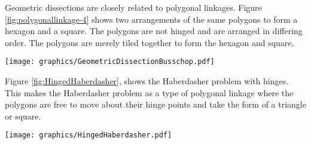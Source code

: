 Geometric dissections are closely related to polygonal linkages.  
Figure \ref{fig:polygonallinkage-4} shows two arrangements of the same polygons to form a hexagon and a square. 
The polygons are not hinged and are arranged in differing order.
The polygons are merely tiled together to form the hexagon and square. 

\begin{minipage}{\linewidth}\begin{center}
\texttt{[image: graphics/GeometricDissectionBusschop.pdf]}
\end{center}
\label{fig:polygonallinkage-4}
\end{minipage}

Figure \ref{fig:HingedHaberdasher}, shows the Haberdasher problem with hinges.  
This makes the Haberdasher problem as a type of polygonal linkage where the polygons are free to move about their hinge points and take the form of a triangle or square.  

\begin{minipage}{\linewidth}
\begin{center}
\texttt{[image: graphics/HingedHaberdasher.pdf]}
\end{center}
\label{fig:HingedHaberdasher}
\end{minipage}







